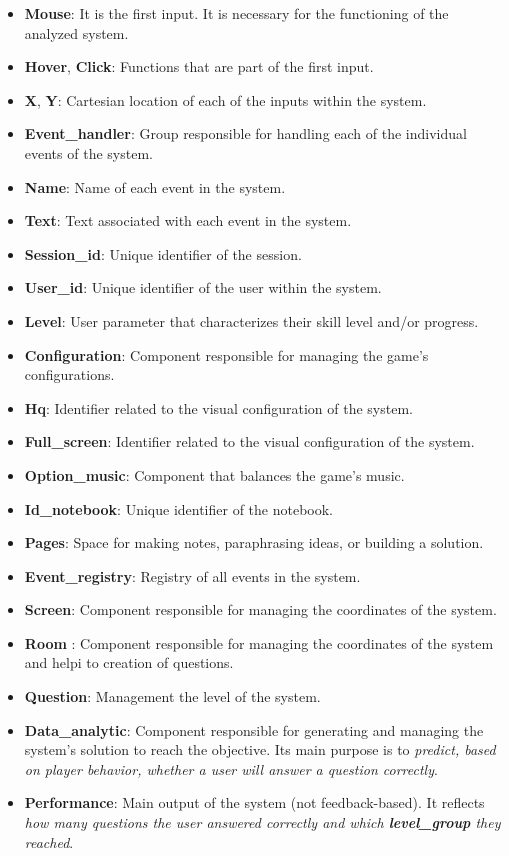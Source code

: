 \documentclass{article}
\begin{document}
\begin{itemize}[leftmargin=*]
    \item \textbf{\textbf{Mouse}}: It is the first input. It is necessary for the functioning of the analyzed system.
    \item \textbf{\textbf{Hover}}, \textbf{\textbf{Click}}: Functions that are part of the first input.
    \item \textbf{\textbf{X}}, \textbf{\textbf{Y}}: Cartesian location of each of the inputs within the system.
    \item \textbf{\textbf{Event\_handler}}: Group responsible for handling each of the individual events of the system.
    \item \textbf{\textbf{Name}}: Name of each event in the system.
    \item \textbf{\textbf{Text}}: Text associated with each event in the system.
    \item \textbf{\textbf{Session\_id}}: Unique identifier of the session.
    \item \textbf{\textbf{User\_id}}: Unique identifier of the user within the system.
    \item \textbf{\textbf{Level}}: User parameter that characterizes their skill level and/or progress.
    \item \textbf{\textbf{Configuration}}: Component responsible for managing the game's configurations.
    \item \textbf{\textbf{Hq}}: Identifier related to the visual configuration of the system.
    \item \textbf{\textbf{Full\_screen}}: Identifier related to the visual configuration of the system.
    \item \textbf{\textbf{Option\_music}}: Component that balances the game’s music.
    \item \textbf{\textbf{Id\_notebook}}: Unique identifier of the notebook.
    \item \textbf{\textbf{Pages}}: Space for making notes, paraphrasing ideas, or building a solution.
    \item \textbf{\textbf{Event\_registry}}: Registry of all events in the system.
    \item \textbf{Screen}: Component responsible for managing the coordinates of the system.
    \item \textbf{Room }: Component responsible for managing the coordinates of the system and helpi to creation of questions.
    \item \textbf{Question}: Management the level of the system.
    \item \textbf{\textbf{Data\_analytic}}: Component responsible for generating and managing the system’s solution to reach the objective. Its main purpose is to \textit{predict, based on player behavior, whether a user will answer a question correctly}.
    \item \textbf{\textbf{Performance}}: Main output of the system (not feedback-based). It reflects \textit{how many questions the user answered correctly and which \textbf{level\_group} they reached}.

\end{itemize}
\end{document}
